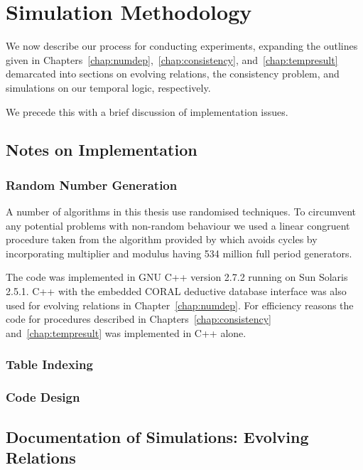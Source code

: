 \chapter{Simulation Methodology}\label{app:sim_meth}

We now describe our process for conducting experiments, expanding the
outlines given in Chapters~\ref{chap:numdep},~\ref{chap:consistency},
and~\ref{chap:tempresult} demarcated into sections on evolving
relations, the consistency problem, and simulations on our temporal
logic, respectively.

\medskip

We precede this with a brief discussion of implementation issues.

\section{Notes on Implementation}\label{sec:imp_notes}


\subsection{Random Number Generation}

A number of algorithms in this thesis use randomised techniques. To
circumvent any potential problems with non-random behaviour we used
a linear congruent procedure taken
from the algorithm provided by \cite{pm88} which
avoids cycles by incorporating multiplier and modulus
having 534 million full period generators. 

\smallskip
The code was implemented in GNU C++ version 2.7.2 running
on Sun Solaris 2.5.1.  C++ with
the embedded CORAL deductive
database interface \cite{rss92} was also used for evolving relations
in Chapter~\ref{chap:numdep}. For efficiency reasons the code for procedures
described in Chapters~\ref{chap:consistency} and~\ref{chap:tempresult}
was implemented in C++ alone.

\subsection{Table Indexing}
\subsection{Code Design}




\section{Documentation of Simulations: Evolving
Relations}\label{sec:sim_er}


